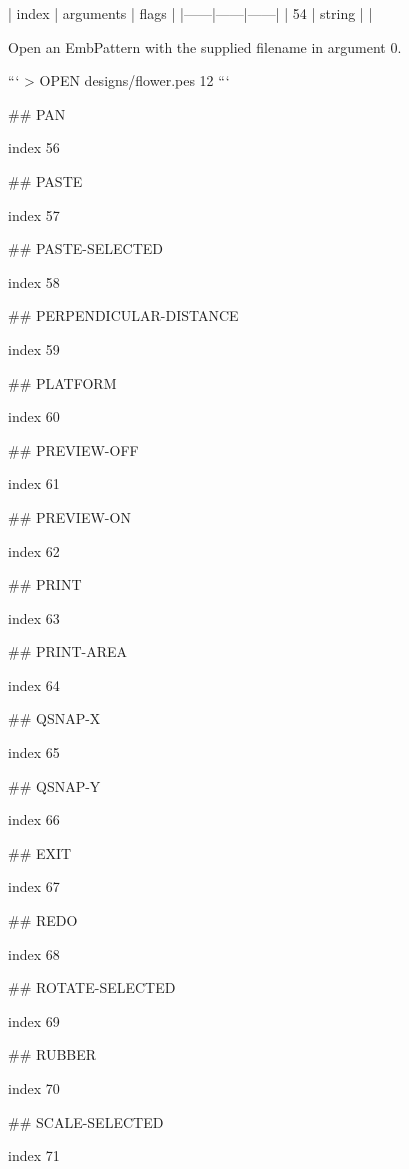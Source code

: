 | index | arguments | flags |
|------|------|------|
| 54 | string | |

Open an EmbPattern with the supplied filename in argument 0.

```
> OPEN designs/flower.pes
12
```

## PAN

index 56



## PASTE

index 57



## PASTE-SELECTED

index 58



## PERPENDICULAR-DISTANCE

index 59



## PLATFORM

index 60



## PREVIEW-OFF

index 61



## PREVIEW-ON

index 62



## PRINT

index 63



## PRINT-AREA

index 64



## QSNAP-X

index 65



## QSNAP-Y

index 66



## EXIT

 index 67



## REDO

index 68



## ROTATE-SELECTED

index 69



## RUBBER

index 70



## SCALE-SELECTED

index 71



